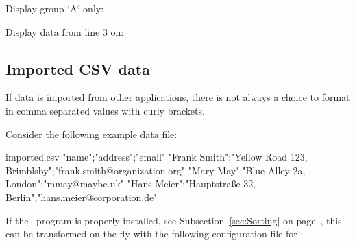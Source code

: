 \documentclass[a4paper,11pt]{ltxdoc}
\begin{document}
\begin{dispExample}
Display group `A` only:\par
{}
\end{dispExample}


\begin{dispExample}
Display data from line 3 on:\par
{}
\end{dispExample}



\clearpage
\subsection{Imported CSV data}\label{sec:importeddata}%
If data is imported from other applications, there is not always a choice
to format in comma separated values with curly brackets.

Consider the following example data file:

\begin{tcbverbatimwrite}{imported.csv}
"name";"address";"email"
"Frank Smith";"Yellow Road 123, Brimblsby";"frank.smith@organization.org"
"Mary May";"Blue Alley 2a, London";"mmay@maybe.uk"
"Hans Meier";"Hauptstraße 32, Berlin";"hans.meier@corporation.de"
\end{tcbverbatimwrite}


If the \csvsorter\ program is properly installed,
see Subsection~\ref{sec:Sorting} on page~\pageref{sec:Sorting},
this can be transformed on-the-fly
with the following configuration file for \csvsorter:
\end{document}

